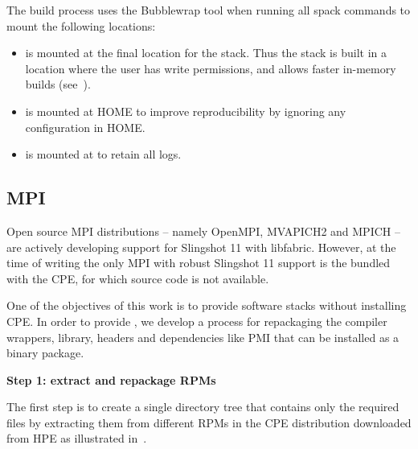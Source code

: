 The build process uses the Bubblewrap tool when running all spack commands to mount the following locations:
\begin{itemize}
    \item {} is mounted at the final location for the \spack stack. Thus the stack is built in a location where the user has write permissions, and allows faster in-memory builds (see~).
    \item {} is mounted at HOME to improve reproducibility by ignoring any \spack configuration in HOME.
    \item {} is mounted at  to retain all \spack logs.
\end{itemize}

\subsection{MPI}
Open source MPI distributions -- namely OpenMPI, MVAPICH2 and MPICH -- are actively developing support for Slingshot 11 with libfabric.
However, at the time of writing the only MPI with robust Slingshot 11 support is the \craympich bundled with the CPE, for which source code is not available.

One of the objectives of this work is to provide software stacks without installing CPE.
In order to provide \craympich, we develop a process for repackaging the compiler wrappers, library, headers and dependencies like PMI that can be installed as a \spack binary package.

\noindent\textbf{Step 1: extract and repackage RPMs}



The first step is to create a single directory tree that contains only the required files by extracting them from different RPMs in the CPE distribution downloaded from HPE as illustrated in~.

